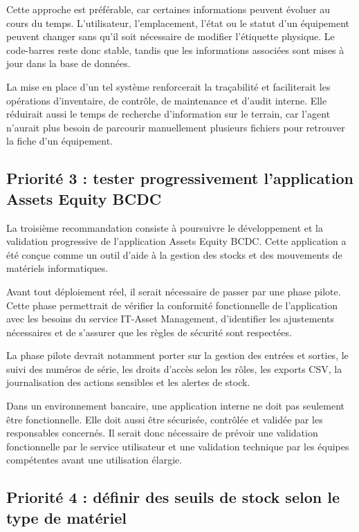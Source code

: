 \documentclass[12pt,a4paper]{report}
\begin{document}
Cette approche est préférable, car certaines informations peuvent évoluer au cours du temps. L'utilisateur, l'emplacement, l'état ou le statut d'un équipement peuvent changer sans qu'il soit nécessaire de modifier l'étiquette physique. Le code-barres reste donc stable, tandis que les informations associées sont mises à jour dans la base de données.

La mise en place d'un tel système renforcerait la traçabilité et faciliterait les opérations d'inventaire, de contrôle, de maintenance et d'audit interne. Elle réduirait aussi le temps de recherche d'information sur le terrain, car l'agent n'aurait plus besoin de parcourir manuellement plusieurs fichiers pour retrouver la fiche d'un équipement.

\subsection{Priorité 3 : tester progressivement l'application Assets Equity BCDC}

La troisième recommandation consiste à poursuivre le développement et la validation progressive de l'application Assets Equity BCDC. Cette application a été conçue comme un outil d'aide à la gestion des stocks et des mouvements de matériels informatiques.

Avant tout déploiement réel, il serait nécessaire de passer par une phase pilote. Cette phase permettrait de vérifier la conformité fonctionnelle de l'application avec les besoins du service IT-Asset Management, d'identifier les ajustements nécessaires et de s'assurer que les règles de sécurité sont respectées.

La phase pilote devrait notamment porter sur la gestion des entrées et sorties, le suivi des numéros de série, les droits d'accès selon les rôles, les exports CSV, la journalisation des actions sensibles et les alertes de stock.

Dans un environnement bancaire, une application interne ne doit pas seulement être fonctionnelle. Elle doit aussi être sécurisée, contrôlée et validée par les responsables concernés. Il serait donc nécessaire de prévoir une validation fonctionnelle par le service utilisateur et une validation technique par les équipes compétentes avant une utilisation élargie.

\subsection{Priorité 4 : définir des seuils de stock selon le type de matériel}
\end{document}
